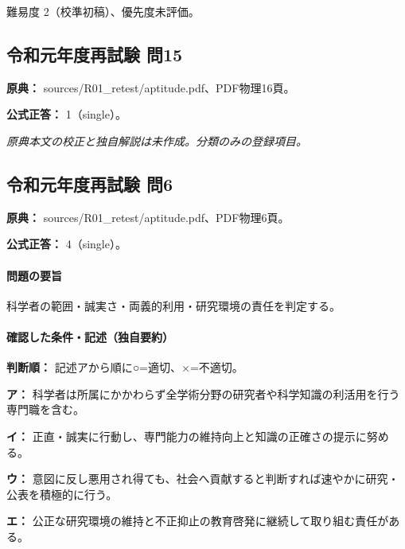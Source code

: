 \par 難易度 2（校準初稿）、優先度未評価。

\subsection{令和元年度再試験 問15}
\label{q:r01-ret-apt-15}

\noindent\textbf{原典：} sources/R01\_retest/aptitude.pdf、PDF物理16頁。

\textbf{公式正答：} 1（single）。

\par\textit{原典本文の校正と独自解説は未作成。分類のみの登録項目。}

\subsection{令和元年度再試験 問6}
\label{q:r01-ret-apt-06}

\noindent\textbf{原典：} sources/R01\_retest/aptitude.pdf、PDF物理6頁。

\textbf{公式正答：} 4（single）。

\paragraph{問題の要旨} 科学者の範囲・誠実さ・両義的利用・研究環境の責任を判定する。

\paragraph{確認した条件・記述（独自要約）}\mbox{}\par

\noindent\textbf{判断順：} 記述アから順に○=適切、×=不適切。\par

\noindent\textbf{ア：} 科学者は所属にかかわらず全学術分野の研究者や科学知識の利活用を行う専門職を含む。\par

\noindent\textbf{イ：} 正直・誠実に行動し、専門能力の維持向上と知識の正確さの提示に努める。\par

\noindent\textbf{ウ：} 意図に反し悪用され得ても、社会へ貢献すると判断すれば速やかに研究・公表を積極的に行う。\par

\noindent\textbf{エ：} 公正な研究環境の維持と不正抑止の教育啓発に継続して取り組む責任がある。\par

